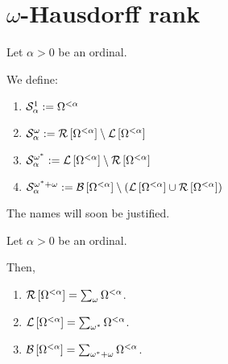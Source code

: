 \section{\texorpdfstring{$\omega$}{omega}-Hausdorff rank}

\begin{definitions}
  Let $\alpha > 0$ be an ordinal.

  We define:
  \begin{enumerate}
    \item $\mathcal{S}^{1}_{\alpha} := \Omega^{< \alpha}$
    \item $\mathcal{S}^{\omega}_{\alpha} := \mathcal{R} \left[ {{\Omega^{< \alpha}}} \right] \setminus \mathcal{L} \left[ {{\Omega^{< \alpha}}} \right]$
    \item $\mathcal{S}^{\omega^\ast}_{\alpha} := \mathcal{L} \left[ {{\Omega^{< \alpha}}} \right] \setminus \mathcal{R} \left[ {{\Omega^{< \alpha}}} \right]$
    \item $\mathcal{S}^{\omega^\ast + \omega}_{\alpha} := \mathcal{B} \left[ {{\Omega^{< \alpha}}} \right] \setminus \left( { \mathcal{L} \left[ {{\Omega^{< \alpha}}} \right] \cup \mathcal{R} \left[ {{\Omega^{< \alpha}}} \right] } \right)$
  \end{enumerate}

  The names will soon be justified.
\end{definitions}

\begin{lemma}\label{bounded-structure}
  Let $\alpha > 0$ be an ordinal.

  Then,
  \begin{enumerate}
    \item $\mathcal{R} \left[ {{\Omega^{< \alpha}}} \right] = \sum_{\omega}{\Omega^{< \alpha}}$.
    \item $\mathcal{L} \left[ {{\Omega^{< \alpha}}} \right] = \sum_{\omega^\ast}{\Omega^{< \alpha}}$.
    \item $\mathcal{B} \left[ {{\Omega^{< \alpha}}} \right] = \sum_{\omega^\ast + \omega}{\Omega^{< \alpha}}$.
  \end{enumerate}
\end{lemma}

